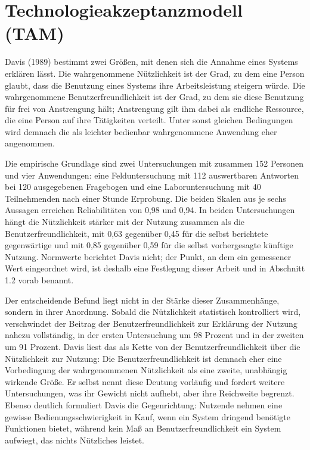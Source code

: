 \section{Technologieakzeptanzmodell (TAM)}
\label{sec:tam}

Davis (1989) bestimmt zwei Größen, mit denen sich die Annahme eines Systems erklären lässt. Die wahrgenommene Nützlichkeit ist der Grad, zu dem eine Person glaubt, dass die Benutzung eines Systems ihre Arbeitsleistung steigern würde. Die wahrgenommene Benutzerfreundlichkeit ist der Grad, zu dem sie diese Benutzung für frei von Anstrengung hält; Anstrengung gilt ihm dabei als endliche Ressource, die eine Person auf ihre Tätigkeiten verteilt. Unter sonst gleichen Bedingungen wird demnach die als leichter bedienbar wahrgenommene Anwendung eher angenommen.

Die empirische Grundlage sind zwei Untersuchungen mit zusammen 152 Personen und vier Anwendungen: eine Felduntersuchung mit 112 auswertbaren Antworten bei 120 ausgegebenen Fragebogen und eine Laboruntersuchung mit 40 Teilnehmenden nach einer Stunde Erprobung. Die beiden Skalen aus je sechs Aussagen erreichen Reliabilitäten von 0,98 und 0,94. In beiden Untersuchungen hängt die Nützlichkeit stärker mit der Nutzung zusammen als die Benutzerfreundlichkeit, mit 0,63 gegenüber 0,45 für die selbst berichtete gegenwärtige und mit 0,85 gegenüber 0,59 für die selbst vorhergesagte künftige Nutzung. Normwerte berichtet Davis nicht; der Punkt, an dem ein gemessener Wert eingeordnet wird, ist deshalb eine Festlegung dieser Arbeit und in Abschnitt 1.2 vorab benannt.

Der entscheidende Befund liegt nicht in der Stärke dieser Zusammenhänge, sondern in ihrer Anordnung. Sobald die Nützlichkeit statistisch kontrolliert wird, verschwindet der Beitrag der Benutzerfreundlichkeit zur Erklärung der Nutzung nahezu vollständig, in der ersten Untersuchung um 98 Prozent und in der zweiten um 91 Prozent. Davis liest das als Kette von der Benutzerfreundlichkeit über die Nützlichkeit zur Nutzung: Die Benutzerfreundlichkeit ist demnach eher eine Vorbedingung der wahrgenommenen Nützlichkeit als eine zweite, unabhängig wirkende Größe. Er selbst nennt diese Deutung vorläufig und fordert weitere Untersuchungen, was ihr Gewicht nicht aufhebt, aber ihre Reichweite begrenzt. Ebenso deutlich formuliert Davis die Gegenrichtung: Nutzende nehmen eine gewisse Bedienungsschwierigkeit in Kauf, wenn ein System dringend benötigte Funktionen bietet, während kein Maß an Benutzerfreundlichkeit ein System aufwiegt, das nichts Nützliches leistet.

